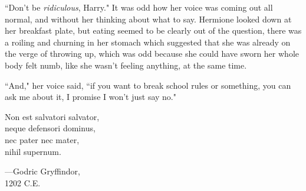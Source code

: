 ``Don't be \emph{ridiculous}, Harry." It was odd how her voice was coming out all normal, and without her thinking about what to say. Hermione looked down at her breakfast plate, but eating seemed to be clearly out of the question, there was a roiling and churning in her stomach which suggested that she was already on the verge of throwing up, which was odd because she could have sworn her whole body felt numb, like she wasn't feeling anything, at the same time.

``And," her voice said, ``if you want to break school rules or something, you can ask me about it, I promise I won't just say no."

\later

\begin{center}
Non est salvatori salvator,\\
neque defensori dominus,\\
nec pater nec mater,\\
nihil supernum.

—Godric Gryffindor,\\
1202 C.E.
\end{center}

